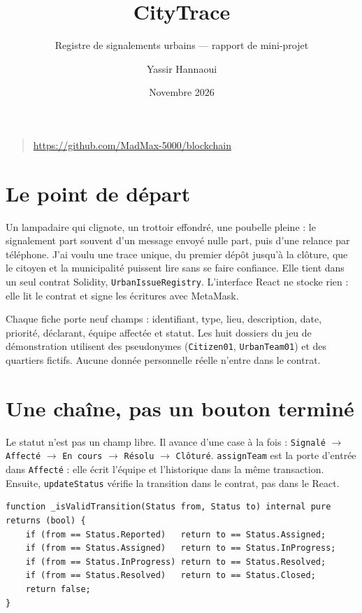 \documentclass[11pt,a4paper,parskip=half,DIV=12,headinclude,footinclude]{scrartcl}
\title{CityTrace}
\subtitle{Registre de signalements urbains --- rapport de mini-projet}
\author{Yassir Hannaoui}
\date{Novembre 2026}
\begin{document}
\maketitle
\vspace{-0.65em}
\noindent{\color{brand}\rule{\textwidth}{1.6pt}}
\vspace{0.7em}

\begin{quote}
\small\color{muted}
    \url{https://github.com/MadMax-5000/blockchain}
\end{quote}
\vspace{0.3em}

\section{Le point de départ}

Un lampadaire qui clignote, un trottoir effondré, une poubelle pleine : le
signalement part souvent d'un message envoyé nulle part, puis d'une relance par
téléphone. J'ai voulu une trace unique, du premier dépôt jusqu'à la clôture, que
le citoyen et la municipalité puissent lire sans se faire confiance. Elle tient
dans un seul contrat Solidity, \texttt{UrbanIssueRegistry}. L'interface React ne
stocke rien : elle lit le contrat et signe les écritures avec MetaMask.

Chaque fiche porte neuf champs : identifiant, type, lieu, description, date,
priorité, déclarant, équipe affectée et statut. Les huit dossiers du jeu de
démonstration utilisent des pseudonymes (\texttt{Citizen01},
\texttt{UrbanTeam01}) et des quartiers fictifs. Aucune donnée personnelle réelle
n'entre dans le contrat.

\section{Une chaîne, pas un bouton \og{}terminé\fg{}}

Le statut n'est pas un champ libre. Il avance d'une case à la fois :
\texttt{Signalé} $\to$ \texttt{Affecté} $\to$ \texttt{En cours} $\to$
\texttt{Résolu} $\to$ \texttt{Clôturé}. \texttt{assignTeam} est la porte d'entrée
dans \texttt{Affecté} : elle écrit l'équipe et l'historique dans la même
transaction. Ensuite, \texttt{updateStatus} vérifie la transition dans le
contrat, pas dans le React.

\begin{lstlisting}
function _isValidTransition(Status from, Status to) internal pure returns (bool) {
    if (from == Status.Reported)   return to == Status.Assigned;
    if (from == Status.Assigned)   return to == Status.InProgress;
    if (from == Status.InProgress) return to == Status.Resolved;
    if (from == Status.Resolved)   return to == Status.Closed;
    return false;
}
\end{lstlisting}
\end{document}
